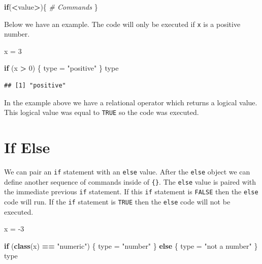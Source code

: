 \documentclass[
]{book}
\newenvironment{Shaded}{\begin{snugshade}}{\end{snugshade}}
\newcommand{\CommentTok}[1]{\textcolor[rgb]{0.56,0.35,0.01}{\textit{#1}}}
\newcommand{\ControlFlowTok}[1]{\textcolor[rgb]{0.13,0.29,0.53}{\textbf{#1}}}
\newcommand{\DecValTok}[1]{\textcolor[rgb]{0.00,0.00,0.81}{#1}}
\newcommand{\KeywordTok}[1]{\textcolor[rgb]{0.13,0.29,0.53}{\textbf{#1}}}
\newcommand{\NormalTok}[1]{#1}
\newcommand{\OperatorTok}[1]{\textcolor[rgb]{0.81,0.36,0.00}{\textbf{#1}}}
\newcommand{\StringTok}[1]{\textcolor[rgb]{0.31,0.60,0.02}{#1}}
\begin{document}
\begin{Shaded}
\begin{Highlighting}[]
\ControlFlowTok{if}\NormalTok{(}\OperatorTok{<}\NormalTok{value}\OperatorTok{>}\NormalTok{)\{}
  \CommentTok{# Commands }
\NormalTok{\}}
\end{Highlighting}
\end{Shaded}

Below we have an example. The code will only be executed if \texttt{x} is a positive number.

\begin{Shaded}
\begin{Highlighting}[]
\NormalTok{x =}\StringTok{ }\DecValTok{3}

\ControlFlowTok{if}\NormalTok{ (x }\OperatorTok{>}\StringTok{ }\DecValTok{0}\NormalTok{) \{}
\NormalTok{    type =}\StringTok{ "positive"}
\NormalTok{\}}
\NormalTok{type}
\end{Highlighting}
\end{Shaded}

\begin{verbatim}
## [1] "positive"
\end{verbatim}

In the example above we have a relational operator which returns a logical value. This logical value was equal to \texttt{TRUE} so the code was executed.

\hypertarget{if-else}{%
\section{If Else}\label{if-else}}

We can pair an \texttt{if} statement with an \texttt{else} value. After the \texttt{else} object we can define another sequence of commands inside of \texttt{\{\}}. The \texttt{else} value is paired with the immediate previous \texttt{if} statement. If this \texttt{if} statement is \texttt{FALSE} then the \texttt{else} code will run. If the \texttt{if} statement is \texttt{TRUE} then the \texttt{else} code will not be executed.

\begin{Shaded}
\begin{Highlighting}[]
\NormalTok{x =}\StringTok{ }\DecValTok{-3}

\ControlFlowTok{if}\NormalTok{ (}\KeywordTok{class}\NormalTok{(x) }\OperatorTok{==}\StringTok{ "numeric"}\NormalTok{) \{}
\NormalTok{    type =}\StringTok{ "number"}
\NormalTok{\} }\ControlFlowTok{else}\NormalTok{ \{}
\NormalTok{    type =}\StringTok{ "not a number"}
\NormalTok{\}}
\NormalTok{type}
\end{Highlighting}
\end{Shaded}
\end{document}
